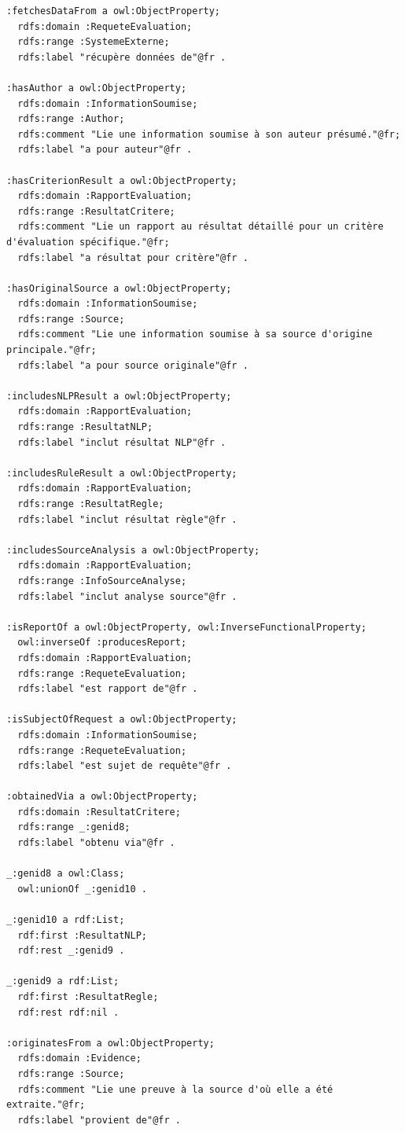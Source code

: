 \documentclass[9pt,twocolumn,twoside,french]{article}
\begin{document}
\begin{lstlisting}[language=Turtle,basicstyle=\ttfamily\tiny,frame=single]
:fetchesDataFrom a owl:ObjectProperty;
  rdfs:domain :RequeteEvaluation;
  rdfs:range :SystemeExterne;
  rdfs:label "récupère données de"@fr .

:hasAuthor a owl:ObjectProperty;
  rdfs:domain :InformationSoumise;
  rdfs:range :Author;
  rdfs:comment "Lie une information soumise à son auteur présumé."@fr;
  rdfs:label "a pour auteur"@fr .

:hasCriterionResult a owl:ObjectProperty;
  rdfs:domain :RapportEvaluation;
  rdfs:range :ResultatCritere;
  rdfs:comment "Lie un rapport au résultat détaillé pour un critère d'évaluation spécifique."@fr;
  rdfs:label "a résultat pour critère"@fr .

:hasOriginalSource a owl:ObjectProperty;
  rdfs:domain :InformationSoumise;
  rdfs:range :Source;
  rdfs:comment "Lie une information soumise à sa source d'origine principale."@fr;
  rdfs:label "a pour source originale"@fr .

:includesNLPResult a owl:ObjectProperty;
  rdfs:domain :RapportEvaluation;
  rdfs:range :ResultatNLP;
  rdfs:label "inclut résultat NLP"@fr .

:includesRuleResult a owl:ObjectProperty;
  rdfs:domain :RapportEvaluation;
  rdfs:range :ResultatRegle;
  rdfs:label "inclut résultat règle"@fr .

:includesSourceAnalysis a owl:ObjectProperty;
  rdfs:domain :RapportEvaluation;
  rdfs:range :InfoSourceAnalyse;
  rdfs:label "inclut analyse source"@fr .

:isReportOf a owl:ObjectProperty, owl:InverseFunctionalProperty;
  owl:inverseOf :producesReport;
  rdfs:domain :RapportEvaluation;
  rdfs:range :RequeteEvaluation;
  rdfs:label "est rapport de"@fr .

:isSubjectOfRequest a owl:ObjectProperty;
  rdfs:domain :InformationSoumise;
  rdfs:range :RequeteEvaluation;
  rdfs:label "est sujet de requête"@fr .

:obtainedVia a owl:ObjectProperty;
  rdfs:domain :ResultatCritere;
  rdfs:range _:genid8;
  rdfs:label "obtenu via"@fr .

_:genid8 a owl:Class;
  owl:unionOf _:genid10 .

_:genid10 a rdf:List;
  rdf:first :ResultatNLP;
  rdf:rest _:genid9 .

_:genid9 a rdf:List;
  rdf:first :ResultatRegle;
  rdf:rest rdf:nil .

:originatesFrom a owl:ObjectProperty;
  rdfs:domain :Evidence;
  rdfs:range :Source;
  rdfs:comment "Lie une preuve à la source d'où elle a été extraite."@fr;
  rdfs:label "provient de"@fr .


\end{lstlisting}
\end{document}
